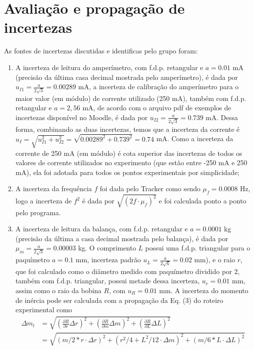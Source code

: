 \section{Avaliação e propagação de incertezas}

As fontes de incertezas discutidas e identificas pelo grupo foram:
\begin{enumerate}
    \item A incerteza de leitura do amperímetro, com f.d.p. retangular e $a=0.01$ mA (precisão da última casa decimal mostrada pelo amperímetro), é dada por $u_{I1}=\frac{a}{2\sqrt{3}}=0.00289$ mA, a incerteza de calibração do amperímetro para o maior valor (em módulo) de corrente utilizado (250 mA), também com f.d.p. retangular e $a= 2,56$ mA, de acordo com o arquivo pdf de exemplos de incertezas disponível no Moodle, é dada por $u_{I2}=\frac{a}{2\sqrt{3}}=0.739$ mA. Dessa forma, combinando as duas incertezas, temos que a incerteza da corrente é $u_I=\sqrt{u_{I1}^2+u_{I2}^2}=\sqrt{0.00289^2+0.739^2}=0.74$ mA. Como a incerteza da corrente de 250 mA (em módulo) é cota superior das incertezas de todos os valores de corrente utilizados no experimento (que estão entre -250 mA e 250 mA), ela foi adotada para todos os pontos experimentais por simplicidade;
    \item A incerteza da frequência $f$ foi dada pelo Tracker como sendo $\mu_f=0.0008$ Hz, logo a incerteza de $f^2$ é dada por $\sqrt{(2f\cdot \mu_f)^2}$ e foi calculada ponto a ponto pelo programa.
    \item A incerteza de leitura da balança, com f.d.p. retangular e $a = 0.0001$ kg (precisão da última a casa
decimal mostrada pelo balança), é dada por $\mu_m = \frac{a}{2\sqrt{3}} = 0.00003$ kg. O comprimento $L$ possui uma f.d.p. triangular para o paquímetro $a=0.1$ mm, incerteza padrão $u_{L}=\frac{a}{2\sqrt{6}}=0.02$ mm), e o raio $r$, que foi calculado como o diâmetro medido com paquímetro dividido por 2, também com f.d.p. triangular, possui metade dessa incerteza, $u_{r}=0.01$ mm, assim como o raio da bobina $R$, com $u_{R}=0.01$ mm.
A incerteza do momento de inércia pode ser calculada com a propagação da Eq. (3) do roteiro experimental como
\begin{align*}
\Delta m_l &=\sqrt{\left(\frac{\partial R}{\partial r} \Delta r\right)^{2}+\left(\frac{\partial R}{\partial m} \Delta m\right)^{2}+\left(\frac{\partial R}{\partial L} \Delta L\right)^{2}} \\
&=\sqrt{(m / 2 * r \cdot \Delta r)^{2}+\left(r^{2} / 4+L^{2} / 12 \cdot \Delta m\right)^{2}+(m / 6 * L \cdot \Delta L)^{2}} \\

\end{align*}
\end{enumerate}
